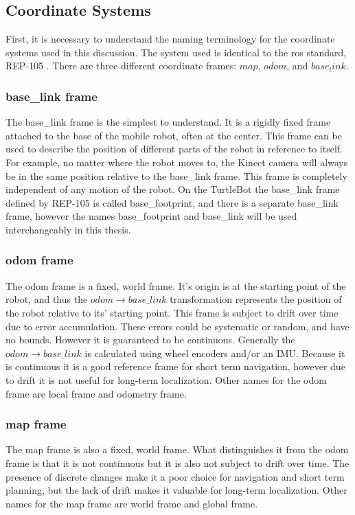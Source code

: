 \documentclass[thesis.tex]{subfile}
\begin{document}
\subsection{Coordinate Systems}
First, it is necessary to understand the naming terminology for the coordinate systems used in this discussion. The system used is identical to the \gls{ros} standard, REP-105 \cite{REP_105}. There are three different coordinate frames: $map$, $odom$, and $base_link$.

\subsubsection{base\_link frame}
The base\_link frame is the simplest to understand. It is a rigidly fixed frame attached to the base of the mobile robot, often at the center. This frame can be used to describe the position of different parts of the robot in reference to itself. For example, no matter where the robot moves to, the Kinect camera will always be in the same position relative to the base\_link frame. This frame is completely independent of any motion of the robot. On the TurtleBot the base\_link frame defined by REP-105 is called base\_footprint, and there is a separate base\_link frame, however the names base\_footprint and base\_link will be used interchangeably in this thesis. 

\subsubsection{odom frame}
The odom frame is a fixed, world frame. It's origin is at the starting point of the robot, and thus the $odom \rightarrow base\_link$ transformation represents the position of the robot relative to its' starting point. This frame is subject to drift over time due to error accumulation. These errors could be systematic or random, and have no bounds. However it is guaranteed to be continuous. Generally the $odom \rightarrow base\_link$ is calculated using wheel encoders and/or an IMU. Because it is continuous it is a good reference frame for short term navigation, however due to drift it is not useful for long-term localization. Other names for the odom frame are local frame and odometry frame.

\subsubsection{map frame}
The map frame is also a fixed, world frame. What distinguishes it from the odom frame is that it is not continuous but it is also not subject to drift over time. The presence of discrete changes make it a poor choice for navigation and short term planning, but the lack of drift makes it valuable for long-term localization. Other names for the map frame are world frame and global frame.
 
\end{document}
